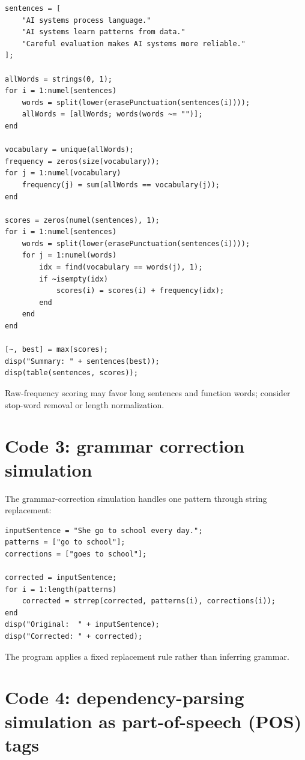 \begin{lstlisting}[style=mlmatlab]
sentences = [
    "AI systems process language."
    "AI systems learn patterns from data."
    "Careful evaluation makes AI systems more reliable."
];

allWords = strings(0, 1);
for i = 1:numel(sentences)
    words = split(lower(erasePunctuation(sentences(i))));
    allWords = [allWords; words(words ~= "")];
end

vocabulary = unique(allWords);
frequency = zeros(size(vocabulary));
for j = 1:numel(vocabulary)
    frequency(j) = sum(allWords == vocabulary(j));
end

scores = zeros(numel(sentences), 1);
for i = 1:numel(sentences)
    words = split(lower(erasePunctuation(sentences(i))));
    for j = 1:numel(words)
        idx = find(vocabulary == words(j), 1);
        if ~isempty(idx)
            scores(i) = scores(i) + frequency(idx);
        end
    end
end

[~, best] = max(scores);
disp("Summary: " + sentences(best));
disp(table(sentences, scores));
\end{lstlisting}

Raw-frequency scoring may favor long sentences and function words; consider stop-word removal or length normalization.

\section{Code 3: grammar correction simulation}

The grammar-correction simulation handles one pattern through string replacement:

\begin{lstlisting}[style=mlmatlab]
inputSentence = "She go to school every day.";
patterns = ["go to school"];
corrections = ["goes to school"];

corrected = inputSentence;
for i = 1:length(patterns)
    corrected = strrep(corrected, patterns(i), corrections(i));
end
disp("Original:  " + inputSentence);
disp("Corrected: " + corrected);
\end{lstlisting}

The program applies a fixed replacement rule rather than inferring grammar.

\section{Code 4: dependency-parsing simulation as part-of-speech (POS) tags}

